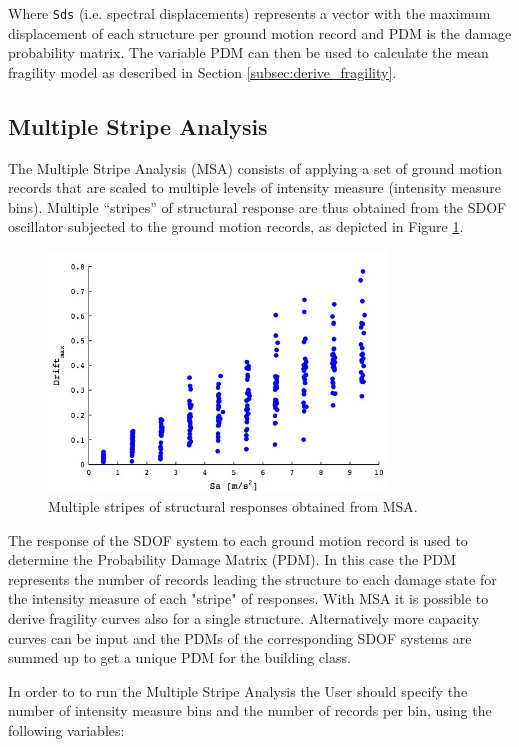 Where \verb=Sds= (i.e. spectral displacements) represents a vector with the maximum displacement of each structure per ground motion record and PDM is the damage probability matrix. The variable PDM can then be used to calculate the mean fragility model as described in Section \ref{subsec:derive_fragility}.

\subsection{Multiple Stripe Analysis}
\label{subsec:NLTHA-MSA}
The Multiple Stripe Analysis (MSA) consists of applying a set of ground motion records that are scaled to multiple levels of intensity measure (intensity measure bins). Multiple “stripes” of structural response are thus obtained from the SDOF oscillator subjected to the ground motion records, as depicted in Figure \ref{fig:msa}.\

\begin{figure}[htb]
  \centering
      \includegraphics[width=9cm]{figures/MSA_example.jpg}
  \caption{Multiple stripes of structural responses obtained from MSA.}
  \label{fig:msa}
\end{figure}

The response of the SDOF system to each ground motion record is used to determine the Probability Damage Matrix (PDM). In this case the PDM represents the number of records leading the structure to each damage state for the intensity measure of each "stripe" of responses. With MSA it is possible to derive fragility curves also for a single structure. Alternatively more capacity curves can be input and the PDMs of the corresponding SDOF systems are summed up to get a unique PDM for the building class.

In order to to run the Multiple Stripe Analysis the User should specify the number of intensity measure bins and the number of records per bin, using the following variables:

